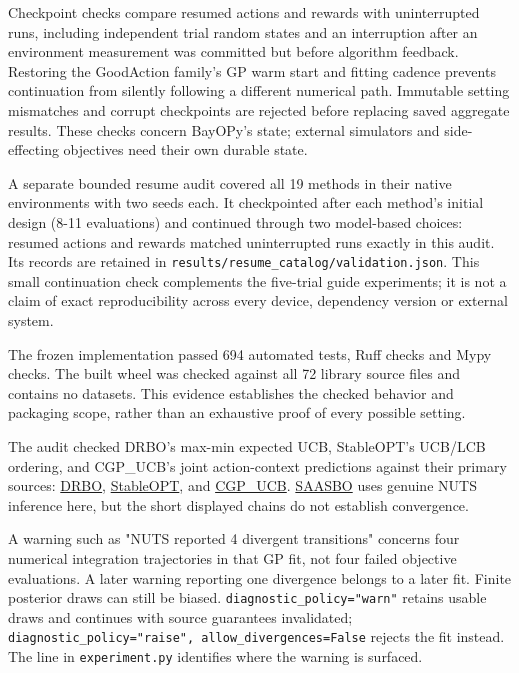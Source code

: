 \documentclass[10pt,a4paper]{article}
\begin{document}
Checkpoint checks compare resumed actions and rewards with uninterrupted runs,\allowbreak{} including independent trial random states and an interruption after an environment measurement was committed but before algorithm feedback. Restoring the GoodAction family's GP warm start and fitting cadence prevents continuation from silently following a different numerical path. Immutable setting mismatches and corrupt checkpoints are rejected before replacing saved aggregate results. These checks concern BayOPy's state; external simulators and side-effecting objectives need their own durable state.


A separate bounded resume audit covered all 19 methods in their native environments with two seeds each. It checkpointed after each method's initial design (8-11 evaluations) and continued through two model-based choices: resumed actions and rewards matched uninterrupted runs exactly in this audit. Its records are retained in \texttt{results/\allowbreak{}resume\_\allowbreak{}catalog/\allowbreak{}validation.\allowbreak{}json}. This small continuation check complements the five-trial guide experiments; it is not a claim of exact reproducibility across every device,\allowbreak{} dependency version or external system.


The frozen implementation passed 694 automated tests,\allowbreak{} Ruff checks and Mypy checks. The built wheel was checked against all 72 library source files and contains no datasets. This evidence establishes the checked behavior and packaging scope,\allowbreak{} rather than an exhaustive proof of every possible setting.


The audit checked DRBO's max-min expected UCB,\allowbreak{} StableOPT's UCB/LCB ordering,\allowbreak{} and CGP\_\allowbreak{}UCB's joint action-context predictions against their primary sources: \href{https://proceedings.mlr.press/v108/kirschner20a/kirschner20a.pdf}{DRBO},\allowbreak{} \href{https://arxiv.org/html/1810.10775v2}{StableOPT},\allowbreak{} and \href{https://proceedings.neurips.cc/paper/2011/file/f3f1b7fc5a8779a9e618e1f23a7b7860-Paper.pdf}{CGP\_\allowbreak{}UCB}. \href{https://proceedings.mlr.press/v161/eriksson21a.html}{SAASBO} uses genuine NUTS inference here,\allowbreak{} but the short displayed chains do not establish convergence.


A warning such as "NUTS reported 4 divergent transitions" concerns four numerical integration trajectories in that GP fit,\allowbreak{} not four failed objective evaluations. A later warning reporting one divergence belongs to a later fit. Finite posterior draws can still be biased. \texttt{diagnostic\_\allowbreak{}policy=\allowbreak{}"warn"} retains usable draws and continues with source guarantees invalidated; \texttt{diagnostic\_\allowbreak{}policy=\allowbreak{}"raise",\allowbreak{} allow\_\allowbreak{}divergences=\allowbreak{}False} rejects the fit instead. The line in \texttt{experiment.\allowbreak{}py} identifies where the warning is surfaced.
\end{document}
